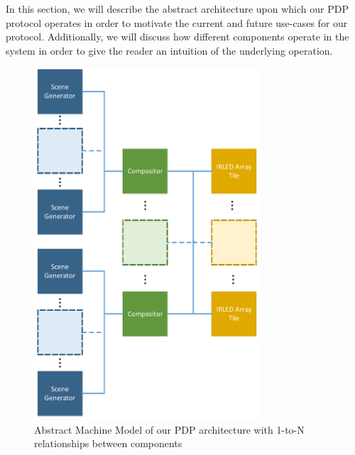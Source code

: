 \label{chap:machine_model}

In this section, we will describe the abstract architecture upon which our PDP protocol operates in order to motivate the current and future use-cases for our protocol. Additionally, we will discuss how different components operate in the system in order to give the reader an intuition of the underlying operation.

\begin{figure}
    \centering
        \centering
        \includegraphics[width=0.75\textwidth]{fig/amm.pdf}
        \caption{Abstract Machine Model of our PDP architecture with 1-to-N relationships between components}
        \label{fig:amm}
\end{figure}

